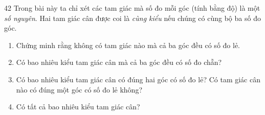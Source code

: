 \begin{probbox}{42}{}
Trong bài này ta chỉ xét các tam giác mà số đo mỗi góc (tính bằng độ) là một \emph{số nguyên}. Hai tam giác cân được coi là \emph{cùng kiểu} nếu chúng có cùng bộ ba số đo góc.
\begin{enumerate}[label=\alph*),leftmargin=1.6em,itemsep=1pt]
\item Chứng minh rằng không có tam giác nào mà cả ba góc đều có số đo lẻ.
\item Có bao nhiêu kiểu tam giác cân mà cả ba góc đều có số đo chẵn?
\item Có bao nhiêu kiểu tam giác cân có đúng hai góc có số đo lẻ? Có tam giác cân nào có đúng một góc có số đo lẻ không?
\item Có tất cả bao nhiêu kiểu tam giác cân?
\end{enumerate}
\end{probbox}
